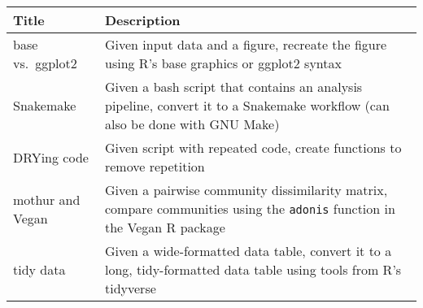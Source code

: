 \documentclass[
  11pt,
]{article}
\begin{document}
\begin{longtable}[]{@{}ll@{}}
\toprule
\begin{minipage}[b]{0.25\columnwidth}\raggedright
\textbf{Title}\strut
\end{minipage} & \begin{minipage}[b]{0.69\columnwidth}\raggedright
\textbf{Description}\strut
\end{minipage}\tabularnewline
\midrule
\endhead
\begin{minipage}[t]{0.25\columnwidth}\raggedright
base vs.~ggplot2\strut
\end{minipage} & \begin{minipage}[t]{0.69\columnwidth}\raggedright
Given input data and a figure, recreate the figure using R's base
graphics or ggplot2 syntax\strut
\end{minipage}\tabularnewline
\begin{minipage}[t]{0.25\columnwidth}\raggedright
Snakemake\strut
\end{minipage} & \begin{minipage}[t]{0.69\columnwidth}\raggedright
Given a bash script that contains an analysis pipeline, convert it to a
Snakemake workflow (can also be done with GNU Make)\strut
\end{minipage}\tabularnewline
\begin{minipage}[t]{0.25\columnwidth}\raggedright
DRYing code\strut
\end{minipage} & \begin{minipage}[t]{0.69\columnwidth}\raggedright
Given script with repeated code, create functions to remove
repetition\strut
\end{minipage}\tabularnewline
\begin{minipage}[t]{0.25\columnwidth}\raggedright
mothur and Vegan\strut
\end{minipage} & \begin{minipage}[t]{0.69\columnwidth}\raggedright
Given a pairwise community dissimilarity matrix, compare communities
using the \texttt{adonis} function in the Vegan R package\strut
\end{minipage}\tabularnewline
\begin{minipage}[t]{0.25\columnwidth}\raggedright
tidy data\strut
\end{minipage} & \begin{minipage}[t]{0.69\columnwidth}\raggedright
Given a wide-formatted data table, convert it to a long, tidy-formatted
data table using tools from R's tidyverse\strut
\end{minipage}\tabularnewline

\end{longtable}
\end{document}
